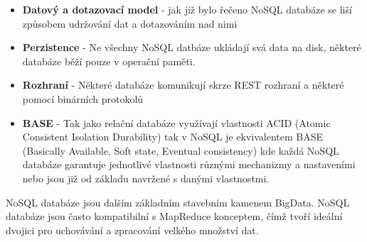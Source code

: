 \begin{itemize}
\item \textbf{Datový a dotazovací model} - jak již bylo řečeno NoSQL databáze se liší způsobem udržování dat a  dotazováním nad nimi
\item \textbf{Perzistence} - Ne všechny NoSQL datbáze ukládají svá data na disk, některé databáze běží pouze v operační paměti.
\item \textbf{Rozhraní} - Některé databáze komunikují skrze REST rozhraní a některé pomocí binárních protokolů 
\item \textbf{BASE} - Tak jako relační databáze využívají vlastnosti ACID (Atomic Consistent Isolation Durability) tak v NoSQL je ekvivalentem BASE (Basically Available, Soft state, Eventual consistency) kde každá NoSQL databáze garantuje jednotlivé vlastnosti různými mechanizmy a nastaveními nebo jsou již od základu navržené s danými vlastnostmi.   
\end{itemize}


NoSQL databáze jsou dalším základním stavebním kamenem BigData. NoSQL databáze jsou často kompatibilní s MapReduce konceptem, čímž tvoří ideální dvojici pro uchovávání a zpracování velkého množství dat. 

